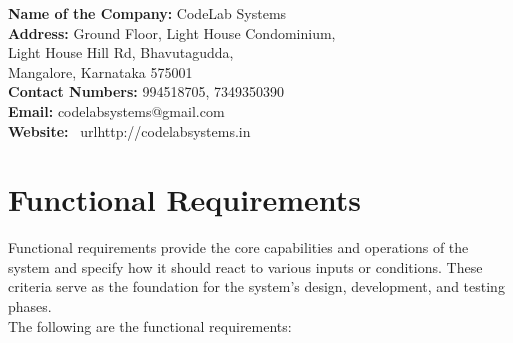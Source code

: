 \begin{flushleft}
\textbf{Name of the Company:} CodeLab Systems \\[2pt]
\textbf{Address:} Ground Floor, Light House Condominium, \\
Light House Hill Rd, Bhavutagudda, \\
Mangalore, Karnataka 575001 \\[2pt]
\textbf{Contact Numbers:} 994518705, 7349350390 \\[2pt]
\textbf{Email:} codelabsystems@gmail.com \\[2pt]
\textbf{Website:} \ url{http://codelabsystems.in}
\end{flushleft}


\section{Functional Requirements}
Functional requirements provide the core capabilities and operations of the system and specify how it should react to various inputs or conditions. These criteria serve as the foundation for the system's design, development, and testing phases.\\
The following are the functional requirements:\\
